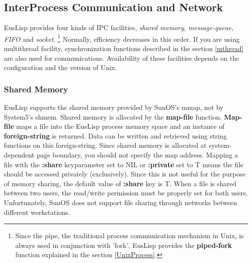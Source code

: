 \begin{refdesc}





\end{refdesc}

\newpage

\subsection{InterProcess Communication and Network}\label{IPC}

EusLisp provides four kinds of IPC facilities,
{\em shared memory, message-queue, FIFO} and {\em socket}.
\footnote{Since the pipe, the traditional process communication
mechanism in Unix, is always used in conjunction with 'fork',
EusLisp provides the {\bf piped-fork} function explained in the section
\ref{UnixProcess}.}
Normally,  efficiency decreases in this order.
If you are using multithread facility, synchronization functions
described in the section \ref{mthread} are also used for communications.
Availability of these facilities depends on the configuration and
the version of Unix.

\subsubsection{Shared Memory}
EusLisp supports the shared memory provided by SunOS's mmap,
not by System5's shmem.
Shared memory is allocated by the {\bf map-file} function.
{\bf Map-file} maps a file into the EusLisp process memory space
and an instance of {\bf foreign-string} is returned.
Data can be written and retrieved using string functions on this
foreign-string.
Since shared memory is allocated at system-dependent page boundary, 
you should not specify the map address.
Mapping a file with the {\bf :share} keyparameter set to NIL
or {\bf :private} set to T
means the file should be accessed privately (exclusively).
Since this is not useful for the purpose of memory sharing,
the default value of {\bf :share} key is T.
When a file is shared between two users, the read/write permission
must be properly set for both users.
Unfortunately, SunOS does not support file sharing through networks 
between different workstations.

